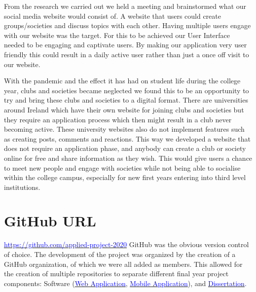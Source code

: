 From the research we carried out we held a meeting and brainstormed what our social media website would consist of. A website that users could create groups/societies and discuss topics with each other. Having multiple users engage with our website was the target. For this to be achieved our User Interface needed to be engaging and captivate users. By making our application very user friendly this could result in a daily active user rather than just a once off visit to our website.
\newline 

With the pandemic and the effect it has had on student life during the college year, clubs and societies became neglected we found this to be an opportunity to try and bring these clubs and societies to a digital format. There are universities around Ireland which have their own website for joining clubs and societies but they require an application process which then might result in a club never becoming active. These university websites also do not implement features such as creating posts, comments and reactions. This way we developed a website that does not require an application phase, and anybody can create a club or society online for free and share information as they wish. This would give users a chance to meet new people and engage with societies while not being able to socialise within the college campus, especially for new first years entering into third level institutions.
\newline

\section{GitHub URL}
\href{https://github.com/applied-project-2020}{\textcolor{blue}{https://github.com/applied-project-2020}}
GitHub was the obvious version control of choice. The development of the project was organized by the creation of a GitHub organization, of which we were all added as members. This allowed for the creation of multiple repositories to separate different final year project components: Software (\href{https://github.com/applied-project-2020/zoosh}{\textcolor{blue}{Web Application}}, \href{https://github.com/applied-project-2020/mobile-application}{\textcolor{blue}{Mobile Application}}), and \href{https://github.com/applied-project-2020/documentation}{\textcolor{blue}{Dissertation}}.

